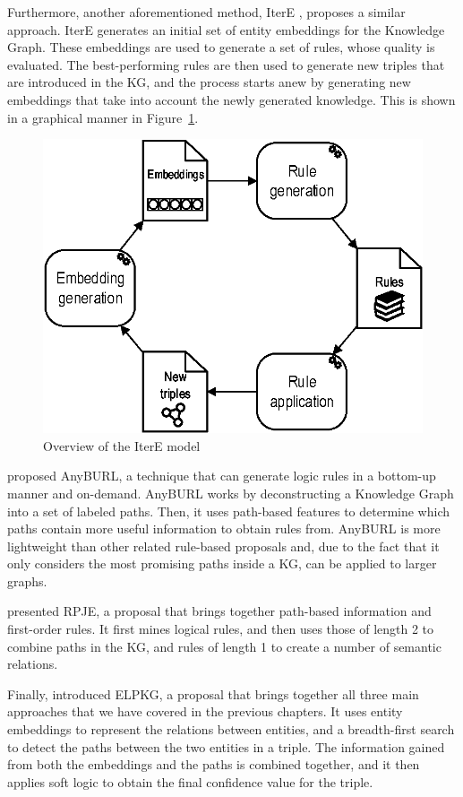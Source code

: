 Furthermore, another aforementioned method, IterE \cite{zhang2019}, proposes a similar approach. IterE generates an initial set of entity embeddings for the Knowledge Graph. These embeddings are used to generate a set of rules, whose quality is evaluated. The best-performing rules are then used to generate new triples that are introduced in the KG, and the process starts anew by generating new embeddings that take into account the newly generated knowledge. This is shown in a graphical manner in Figure~\ref{fig:rule-itere}.

\begin{figure}[!htp]
    \centering
    \includegraphics[width=.65\textwidth]{fig/rules/itere}
    \caption{Overview of the IterE model}
    \label{fig:rule-itere}
\end{figure}

\citet{meilicke2019} proposed AnyBURL, a technique that can generate logic rules in a bottom-up manner and on-demand. AnyBURL works by deconstructing a Knowledge Graph into a set of labeled paths. Then, it uses path-based features to determine which paths contain more useful information to obtain rules from. AnyBURL is more lightweight than other related rule-based proposals and, due to the fact that it only considers the most promising paths inside a KG, can be applied to larger graphs.

\citet{niu2020} presented RPJE, a proposal that brings together path-based information and first-order rules. It first mines logical rules, and then uses those of length 2 to combine paths in the KG, and rules of length 1 to create a number of semantic relations.

Finally, \citet{ma2019} introduced ELPKG, a proposal that brings together all three main approaches that we have covered in the previous chapters. It uses entity embeddings to represent the relations between entities, and a breadth-first search to detect the paths between the two entities in a triple. The information gained from both the embeddings and the paths is combined together, and it then applies soft logic to obtain the final confidence value for the triple. 

